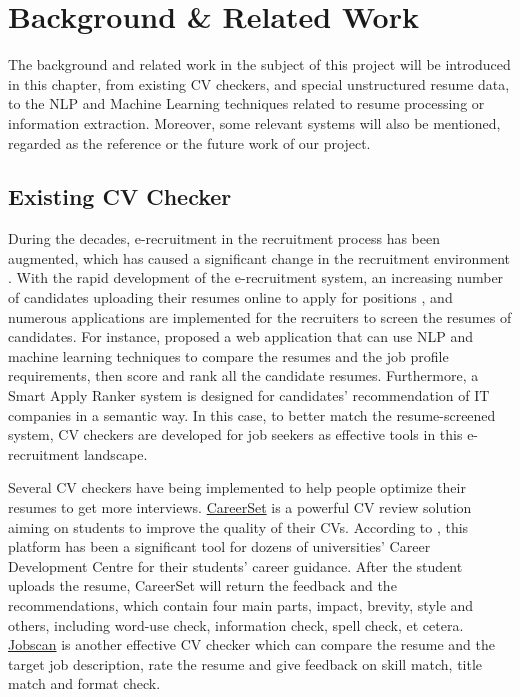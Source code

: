 \chapter{Background \& Related Work}
\label{ch:background} 

The background and related work in the subject of this project will be introduced in this chapter, from existing CV checkers, and special unstructured resume data, to the NLP and Machine Learning techniques related to resume processing or information extraction. Moreover, some relevant systems will also be mentioned, regarded as the reference or the future work of our project.


\section{Existing CV Checker}

During the decades, e-recruitment in the recruitment process has been augmented, which has caused a significant change in the recruitment environment \cite{barber2006recruitment}. With the rapid development of the e-recruitment system, an increasing number of candidates uploading their resumes online to apply for positions \cite{mittal2020methodology}, and numerous applications are implemented for the recruiters to screen the resumes of candidates. For instance, \cite{amin2019web} proposed a web application that can use NLP and machine learning techniques to compare the resumes and the job profile requirements, then score and rank all the candidate resumes. Furthermore, a Smart Apply Ranker system \cite{mohamed2018smart} is designed for candidates' recommendation of IT companies in a semantic way. In this case, to better match the resume-screened system, CV checkers are developed for job seekers as effective tools in this e-recruitment landscape.


Several CV checkers have being implemented to help people optimize their resumes to get more interviews.  \href{https://careerset.com/}{CareerSet} is a powerful CV review solution aiming on students to improve the quality of their CVs. According to \cite{laffey_2022}, this platform has been a significant tool for dozens of universities' Career Development Centre for their students' career guidance. After the student uploads the resume, CareerSet will return the feedback and the recommendations, which contain four main parts, impact, brevity, style and others, including word-use check, information check, spell check, et cetera. \href{https://www.jobscan.co/}{Jobscan} is another effective CV checker which 
can compare the resume and the target job description, rate the resume and give feedback on skill match, title match and format check.

